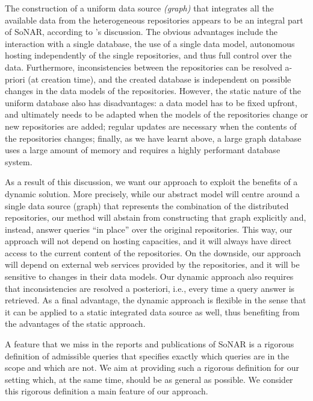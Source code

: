 The construction of a uniform data source \emph{(graph)} that integrates all the available data
from the heterogeneous repositories appears to be an integral part of SoNAR,
according to \citeauthor*{Menzel2020}'s \autocite*{Menzel2020} discussion.
The obvious advantages include the interaction with a single database,
the use of a single data model, autonomous hosting
independently of the single repositories, and thus full control over the data.
Furthermore, inconsistencies
between the repositories can be resolved a-priori (at creation time),
and the created database is independent on possible changes in the data models of the repositories.
However, the static nature of the uniform database also has disadvantages:
a data model has to be fixed upfront, and ultimately needs to be adapted when
the models of the repositories change or new repositories are added;
regular updates are necessary when the contents of the repositories changes;
finally, as we have learnt above,
a large graph database uses a large amount of memory and requires a highly performant
database system.

As a result of this discussion,
we want our approach to exploit the benefits of a dynamic solution.
More precisely, while our abstract model will centre around a single data source (graph)
that represents the combination of the distributed repositories,
our method will abstain from constructing that graph explicitly and, instead,
answer queries \enquote{in place} over the original repositories.
This way, our approach will not depend on hosting capacities,
and it will always have direct access to the current content of the repositories.
On the downside, our approach will depend on external web services provided by the repositories,
and it will be sensitive to changes in their data models.
Our dynamic approach also requires that inconsistencies are resolved
a posteriori, i.e., every time a query answer is retrieved.
As a final advantage, the dynamic approach is flexible
in the sense that it can be applied to a static integrated data source as well,
thus benefiting from the advantages of the static approach.

A feature that we miss in the reports and publications of SoNAR is a rigorous definition of admissible queries
that specifies exactly which queries are in the scope and which are not.
We aim at providing such a rigorous definition for our setting
which, at the same time, should be as general as possible. We consider this rigorous definition
a main feature of our approach.

